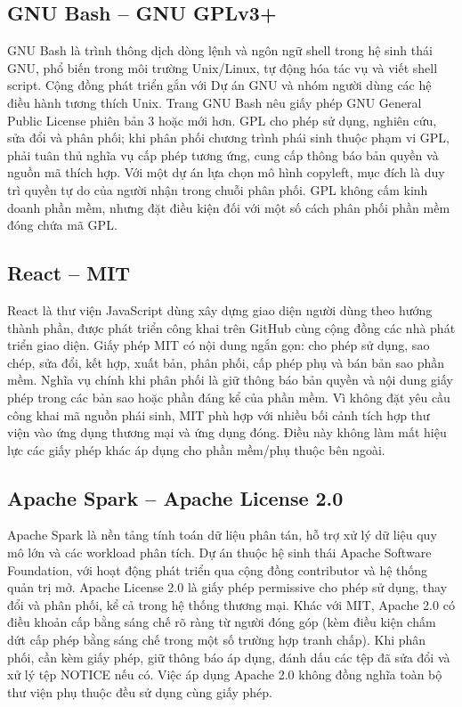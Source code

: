 \documentclass[12pt,a4paper]{article}
\begin{document}
\subsection{GNU Bash -- GNU GPLv3+}
GNU Bash là trình thông dịch dòng lệnh và ngôn ngữ shell trong hệ sinh thái GNU, phổ biến trong môi trường Unix/Linux, tự động hóa tác vụ và viết shell script. Cộng đồng phát triển gắn với Dự án GNU và nhóm người dùng các hệ điều hành tương thích Unix. Trang GNU Bash nêu giấy phép GNU General Public License phiên bản 3 hoặc mới hơn. GPL cho phép sử dụng, nghiên cứu, sửa đổi và phân phối; khi phân phối chương trình phái sinh thuộc phạm vi GPL, phải tuân thủ nghĩa vụ cấp phép tương ứng, cung cấp thông báo bản quyền và nguồn mã thích hợp. Với một dự án lựa chọn mô hình copyleft, mục đích là duy trì quyền tự do của người nhận trong chuỗi phân phối. GPL không cấm kinh doanh phần mềm, nhưng đặt điều kiện đối với một số cách phân phối phần mềm đóng chứa mã GPL.
\subsection{React -- MIT}
React là thư viện JavaScript dùng xây dựng giao diện người dùng theo hướng thành phần, được phát triển công khai trên GitHub cùng cộng đồng các nhà phát triển giao diện. Giấy phép MIT có nội dung ngắn gọn: cho phép sử dụng, sao chép, sửa đổi, kết hợp, xuất bản, phân phối, cấp phép phụ và bán bản sao phần mềm. Nghĩa vụ chính khi phân phối là giữ thông báo bản quyền và nội dung giấy phép trong các bản sao hoặc phần đáng kể của phần mềm. Vì không đặt yêu cầu công khai mã nguồn phái sinh, MIT phù hợp với nhiều bối cảnh tích hợp thư viện vào ứng dụng thương mại và ứng dụng đóng. Điều này không làm mất hiệu lực các giấy phép khác áp dụng cho phần mềm/phụ thuộc bên ngoài.
\subsection{Apache Spark -- Apache License 2.0}
Apache Spark là nền tảng tính toán dữ liệu phân tán, hỗ trợ xử lý dữ liệu quy mô lớn và các workload phân tích. Dự án thuộc hệ sinh thái Apache Software Foundation, với hoạt động phát triển qua cộng đồng contributor và hệ thống quản trị mở. Apache License 2.0 là giấy phép permissive cho phép sử dụng, thay đổi và phân phối, kể cả trong hệ thống thương mại. Khác với MIT, Apache 2.0 có điều khoản cấp bằng sáng chế rõ ràng từ người đóng góp (kèm điều kiện chấm dứt cấp phép bằng sáng chế trong một số trường hợp tranh chấp). Khi phân phối, cần kèm giấy phép, giữ thông báo áp dụng, đánh dấu các tệp đã sửa đổi và xử lý tệp NOTICE nếu có. Việc áp dụng Apache 2.0 không đồng nghĩa toàn bộ thư viện phụ thuộc đều sử dụng cùng giấy phép.
\end{document}
